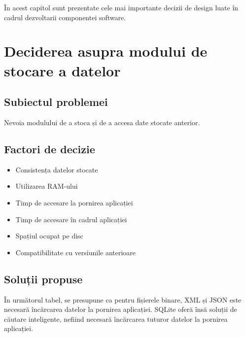\label{cap1}


\label{Chapter1} %

\thispagestyle{fancy}

În acest capitol sunt prezentate cele mai importante decizii de design luate în cadrul dezvoltarii componentei software.

\section{Deciderea asupra modului de stocare a datelor} 

	\subsection{Subiectul problemei} 
	Nevoia modulului de a stoca și de a accesa date stocate anterior.

	\subsection{Factori de decizie} 
	\begin{itemize}
	 \setlength\itemsep{0em}
		\item Consistența datelor stocate
		\item Utilizarea RAM-ului
		\item Timp de accesare la pornirea aplicației
		\item Timp de accesare în cadrul aplicației
		\item Spațiul ocupat pe disc
		\item Compatibilitate cu versiunile anterioare
	\end{itemize}

	\subsection{Soluții propuse}
	În următorul tabel, se presupune ca pentru fișierele binare, XML și JSON este necesară încărcarea datelor la pornirea aplicației. SQLite oferă însă soluții de căutare inteligente, nefiind necesară încărcarea tuturor datelor la pornirea aplicației.

